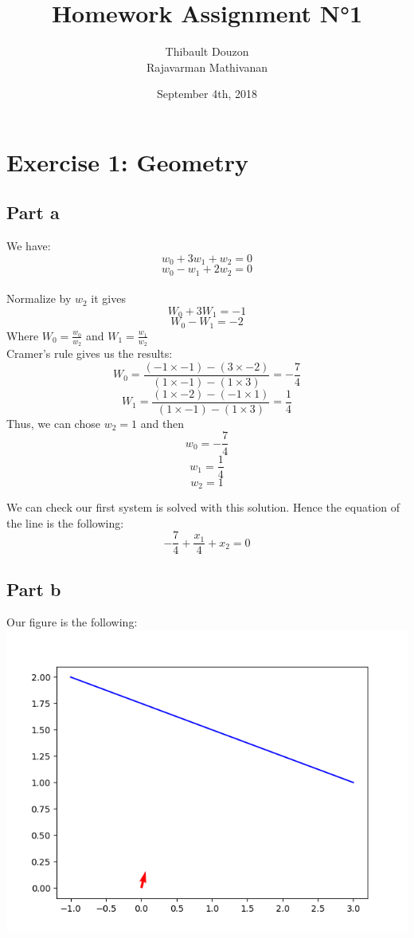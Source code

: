 \documentclass[a4paper, 10pt]{article}
\title{Homework Assignment N°1}
\author{Thibault Douzon\\Rajavarman Mathivanan}
\date{September 4th, 2018}
\begin{document}
\maketitle

\pagebreak

\tableofcontents
\pagebreak

\section{Exercise 1: Geometry}
\subsection{Part a}
We have:
\\
$$
w_0 + 3w_1 + w_2 = 0
$$
$$
w_0 - w_1 + 2w_2 = 0
$$
\\
Normalize by $w_2$ it gives
\\
$$
W_0 + 3W_1 = -1
$$
$$
W_0 - W_1 = -2
$$
Where $W_0 = \frac{w_0}{w_2}$ and $W_1 = \frac{w_1}{w_2}$
\\
Cramer's rule gives us the results:
$$
W_0 = \frac{(-1 \times -1) - (3 \times -2)}{(1 \times -1) - (1 \times 3)}
    = -\frac{7}{4}
$$
$$
W_1 = \frac{(1 \times -2) - (-1 \times 1)}{(1 \times -1) - (1 \times 3)}
    = \frac{1}{4}
$$
Thus, we can chose $w_2 = 1$ and then
$$
w_0 = - \frac{7}{4}
$$
$$
w_1 = \frac{1}{4}
$$
$$
w_2 = 1
$$

We can check our first system is solved with this solution.
Hence the equation of the line is the following:
$$
- \frac{7}{4} + \frac{x_1}{4} + x_2 = 0
$$ 

\subsection{Part b}
Our figure is the following:
\\
\includegraphics[scale=0.6]{ex1_partb.png}
\end{document}
